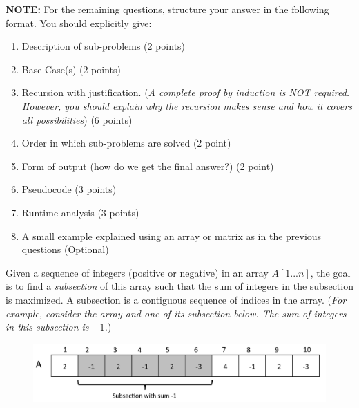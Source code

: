 \documentclass[answers]{exam}
\begin{document}
\begin{questions}
\hrulefill

\textbf{NOTE: }For the remaining questions, structure your answer in the following format. You should explicitly give:

\begin{enumerate}
    \item Description of sub-problems (2 points) 

    \item Base Case(s) (2 points)
    
    \item Recursion with justification. 
    ({\it A complete proof by induction is NOT required. However, you should explain why the recursion makes sense and how it covers all possibilities}) (6 points)

    \item Order in which sub-problems are solved  (2 point)

    \item Form of output (how do we get the final answer?) (2 point) 

    \item Pseudocode (3 points) 

    \item Runtime analysis (3 points)

    \item  A small example explained using an array or matrix as in the previous questions (Optional)
\end{enumerate}

\hrulefill

\newpage

\question[20] Given a sequence of integers (positive or negative) in an array $A[1...n]$, the goal is to find a {\em subsection} of this array such that the sum of integers in the subsection is maximized. A subsection is a contiguous sequence of indices in the array.
({\it For example, consider the array and one of its subsection below. The sum of integers in this subsection is $-1$.})


\begin{figure}[h]
\centering
\includegraphics[scale=0.23]{subsection}
\end{figure}


\end{questions}
\end{document}
